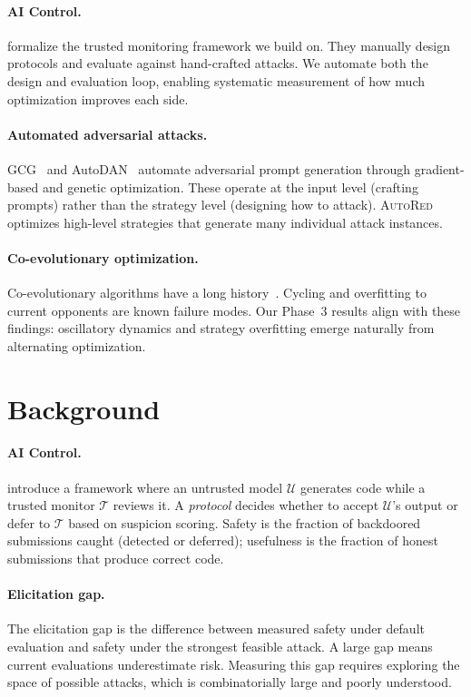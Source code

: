 \documentclass{article}
\newcommand{\ours}{\textsc{AutoRed}}
\begin{document}
\paragraph{AI Control.} \citet{greenblatt2024ai} formalize the trusted monitoring framework we build on. They manually design protocols and evaluate against hand-crafted attacks. We automate both the design and evaluation loop, enabling systematic measurement of how much optimization improves each side.

\paragraph{Automated adversarial attacks.} GCG~\citep{zou2023universal} and AutoDAN~\citep{liu2024autodan} automate adversarial prompt generation through gradient-based and genetic optimization. These operate at the input level (crafting prompts) rather than the strategy level (designing how to attack). \ours{} optimizes high-level strategies that generate many individual attack instances.

\paragraph{Co-evolutionary optimization.} Co-evolutionary algorithms have a long history~\citep{popovici2012coevolutionary}. Cycling and overfitting to current opponents are known failure modes. Our Phase~3 results align with these findings: oscillatory dynamics and strategy overfitting emerge naturally from alternating optimization.


\section{Background}

\paragraph{AI Control.} \citet{greenblatt2024ai} introduce a framework where an untrusted model $\mathcal{U}$ generates code while a trusted monitor $\mathcal{T}$ reviews it. A \emph{protocol} decides whether to accept $\mathcal{U}$'s output or defer to $\mathcal{T}$ based on suspicion scoring. Safety is the fraction of backdoored submissions caught (detected or deferred); usefulness is the fraction of honest submissions that produce correct code.

\paragraph{Elicitation gap.} The elicitation gap is the difference between measured safety under default evaluation and safety under the strongest feasible attack. A large gap means current evaluations underestimate risk. Measuring this gap requires exploring the space of possible attacks, which is combinatorially large and poorly understood.
\end{document}
